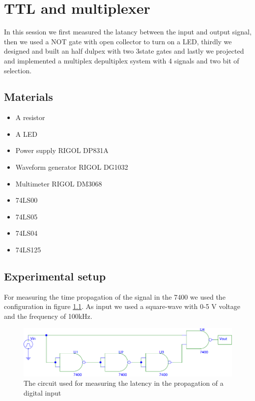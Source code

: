 \chapter{TTL and multiplexer}
In this session we first measured the latancy between the input and output signal, then we used a NOT gate with open collector to turn on a LED, thirdly we designed and built an half dulpex with two 3state gates and lastly we projected and implemented a multiplex depultiplex system with 4 signals and two bit of selection.

\section{Materials}
\begin{itemize}
\item A resistor
\item A LED
\item Power supply RIGOL DP831A
\item Waveform generator RIGOL DG1032
\item Multimeter RIGOL DM3068
\item 74LS00
\item 74LS05
\item 74LS04
\item 74LS125
\end{itemize}

\section{Experimental setup}
For measuring the time propagation of the signal in the 7400 we used the configuration in figure \ref{latency}. As input we used a square-wave with 0-5 V voltage and the frequency of 100kHz.
\begin{figure}[H]
\centering
\includegraphics[width=.7\textwidth]{10/latency.png}
\caption{The circuit used for measuring the latency in the propagation of a digital input}\label{latency}
\end{figure}

